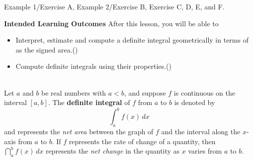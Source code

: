 \documentclass[10pt]{article}
\begin{document}
\core Example 1/Exercise A, Example 2/Exercise B, Exercise C, D, E, and F.

\newpage


\textbf{Intended Learning Outcomes}
After this lesson, you will be able to 

\begin{itemize}
    \item Interpret, estimate and compute a definite integral geometrically in terms of as the signed area.()
    \item Compute definite integrals using their properties.()
\end{itemize}

\vspace{-0.4cm}

\hrulefill\\

\vspace{-0.6cm}
{
Let $a$ and $b$ be real numbers with $a<b$, and suppose $f$ is continuous on the interval $[a,b]$. The {\bf definite integral} of $f$ from $a$ to $b$ is denoted by \[\int_a^b f(x)\,dx\] and represents the {\it net area} between the graph of $f$ and the interval along the $x$-axis from $a$ to $b$. If $f$ represents the rate of change of a quantity, then $\dint_a^b f(x)\,dx$ represents the {\it net change} in the quantity as $x$ varies from $a$ to $b$.
}
\end{document}
